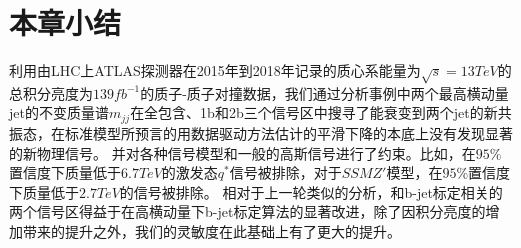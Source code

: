 \section{本章小结} 
\label{sec:DijetCon}

利用由LHC上ATLAS探测器在2015年到2018年记录的质心系能量为$\sqrt{s}=13TeV$的总积分亮度为$139fb^{-1}$的质子-质子对撞数据，我们通过分析事例中两个最高横动量jet的不变质量谱$m_{jj}$在全包含、1b和2b三个信号区中搜寻了能衰变到两个jet的新共振态，在标准模型所预言的用数据驱动方法估计的平滑下降的本底上没有发现显著的新物理信号。
并对各种信号模型和一般的高斯信号进行了约束。比如，在$95\%$置信度下质量低于$6.7TeV$的激发态$q^*$信号被排除，对于$SSM Z'$模型，在$95\%$置信度下质量低于$2.7TeV$的信号被排除。
相对于上一轮类似的分析，和b-jet标定相关的两个信号区得益于在高横动量下b-jet标定算法的显著改进，除了因积分亮度的增加带来的提升之外，我们的灵敏度在此基础上有了更大的提升。





